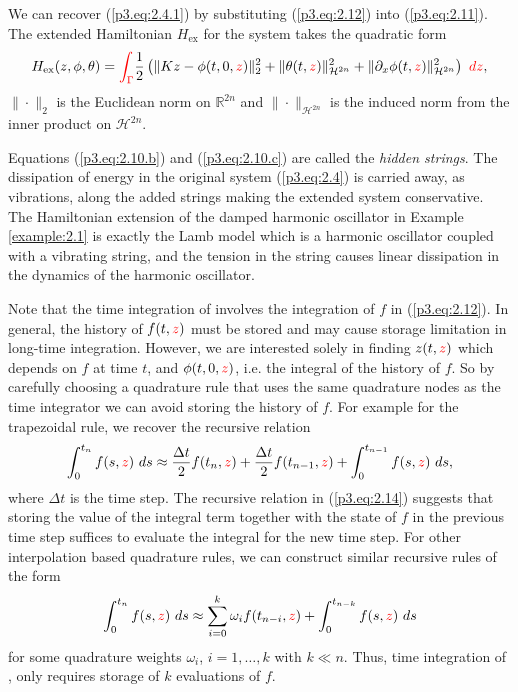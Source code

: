 We can recover (\ref{p3.eq:2.4.1}) by substituting (\ref{p3.eq:2.12}) into (\ref{p3.eq:2.11}). The extended Hamiltonian $H_\text{ex}$ for the system  takes the quadratic form
\begin{equation} \label{p3.eq:2.13}
	H_\text{ex}(z,\phi,\theta) = \edit{\int_{\Gamma} }\frac 1 2 \left( \| Kz - \phi(t,0,\edit{z}) \|_2^2 + \| \theta(t,\edit{z}) \|^2_{\mathcal H^{2n} } + \| \partial_x\phi(t,\edit{z})\|^2_{\mathcal H^{2n} }\right)\ \edit{dz},
\end{equation}
 $\| \cdot \|_2$ is the Euclidean norm on $\mathbb R^{2n}$ and $\| \cdot \|_{\mathcal H^{2n}}$ is the induced norm from the inner product on $\mathcal H^{2n}$. 

Equations (\ref{p3.eq:2.10.b}) and (\ref{p3.eq:2.10.c}) are called the \emph{hidden strings}. The dissipation of energy in the original system (\ref{p3.eq:2.4}) is carried away, as vibrations, along the added strings making the extended system conservative. The Hamiltonian extension of the damped harmonic oscillator in Example \ref{example:2.1} is exactly the Lamb model \cite{lamb:1900} which is a harmonic oscillator coupled with a vibrating string, and the tension in the string causes linear dissipation in the dynamics of the harmonic oscillator.

Note that the time integration of  involves the integration of $f$ in (\ref{p3.eq:2.12}). In general, the history of $f(t,{\color{red} z})$ must be stored and may cause storage limitation in long-time integration. However, we are interested solely in finding $z(t,{\color{red} z})$ which depends on $f$ at time $t$, and $\phi(t,0,{\color{red} z})$, i.e. the integral of the history of $f$. So by carefully choosing a quadrature rule that uses the same quadrature nodes as the time integrator we can avoid storing the history of $f$. For example for the trapezoidal rule, we recover the recursive relation
\begin{equation} \label{p3.eq:2.14}
	\int_{0}^{t_n} f(s,{\color{red} z}) \ ds \approx \frac{\Delta t}{2} f(t_n,{\color{red} z}) + \frac{\Delta t}{2} f(t_{n-1},{\color{red} z}) + \int_{0}^{t_{n-1}} f(s,{\color{red} z}) \ ds,
\end{equation}
where $\Delta t$ is the time step. The recursive relation in (\ref{p3.eq:2.14}) suggests that storing the value of the integral term together with the state of $f$ in the previous time step suffices to evaluate the integral for the new time step. For other interpolation based quadrature rules, we can construct similar recursive rules of the form
\begin{equation}
	\int_{0}^{t_n} f(s,{\color{red} z}) \ ds \approx \sum_{i=0}^{k} \omega_i f(t_{n-i},{\color{red} z})  + \int_{0}^{t_{n-k}} f(s,{\color{red} z}) \ ds
\end{equation}
for some quadrature weights $\omega_i$, $i=1,\dots,k$ with $k\ll n$. Thus, time integration of , only requires storage of $k$ evaluations of $f$.


